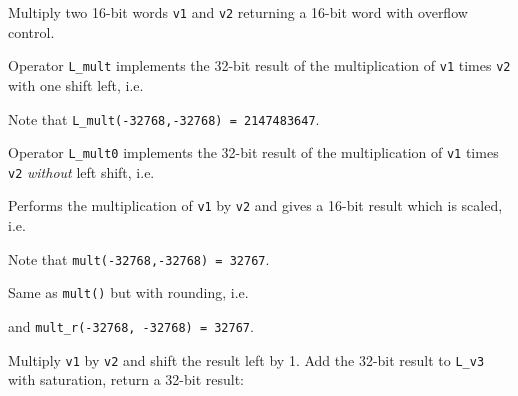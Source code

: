 
Multiply two 16-bit words {\tt v1} and {\tt v2} returning a 16-bit word with overflow control.


Operator {\tt L\_mult} implements the 32-bit result of the multiplication of {\tt v1} times {\tt v2} with one shift left, i.e.


Note that {\tt L\_mult(-32768,-32768) = 2147483647}.


Operator {\tt L\_mult0} implements the 32-bit result of the multiplication of {\tt v1} times {\tt v2} {\em without} left shift, i.e.



Performs the multiplication of {\tt v1} by {\tt v2} and gives a 16-bit result which is scaled, i.e.


Note that {\tt mult(-32768,-32768) = 32767}.


Same as {\tt mult()} but with rounding, i.e.


and {\tt mult\_r(-32768, -32768) = 32767}.


Multiply {\tt v1} by {\tt v2} and shift the result left by 1.
Add the 32-bit result to {\tt L\_v3} with saturation, return a 32-bit result:



